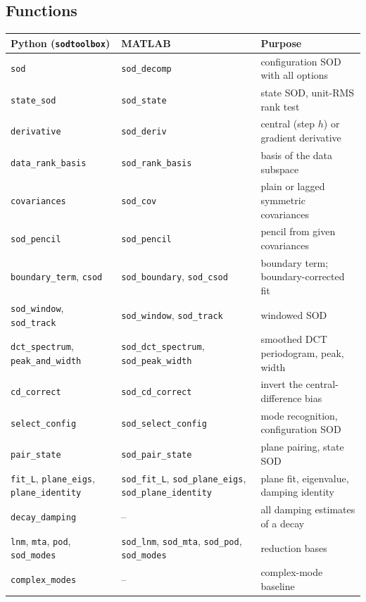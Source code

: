 \documentclass[report]{nld}
\newcommand{\code}[1]{\texttt{#1}}
\begin{document}
\subsection{Functions}
\begin{center}\small
\begin{longtable}{@{}>{\raggedright}p{4.6cm}>{\raggedright}p{4.0cm}p{6.2cm}@{}}
\toprule
Python (\code{sodtoolbox}) & MATLAB & Purpose\\
\midrule\endhead
\code{sod} & \code{sod\_decomp} & configuration SOD with all options\\
\code{state\_sod} & \code{sod\_state} & state SOD, unit-RMS rank test\\
\code{derivative} & \code{sod\_deriv} & central (step $h$) or gradient derivative\\
\code{data\_rank\_basis} & \code{sod\_rank\_basis} & basis of the data subspace\\
\code{covariances} & \code{sod\_cov} & plain or lagged symmetric covariances\\
\code{sod\_pencil} & \code{sod\_pencil} & pencil from given covariances\\
\code{boundary\_term}, \code{csod} & \code{sod\_boundary}, \code{sod\_csod} & boundary term; boundary-corrected fit\\
\code{sod\_window}, \code{sod\_track} & \code{sod\_window}, \code{sod\_track} & windowed SOD\\
\code{dct\_spectrum}, \code{peak\_and\_width} & \code{sod\_dct\_spectrum}, \code{sod\_peak\_width} & smoothed DCT periodogram, peak, width\\
\code{cd\_correct} & \code{sod\_cd\_correct} & invert the central-difference bias\\
\code{select\_config} & \code{sod\_select\_config} & mode recognition, configuration SOD\\
\code{pair\_state} & \code{sod\_pair\_state} & plane pairing, state SOD\\
\code{fit\_L}, \code{plane\_eigs}, \code{plane\_identity} & \code{sod\_fit\_L}, \code{sod\_plane\_eigs}, \code{sod\_plane\_identity} & plane fit, eigenvalue, damping identity\\
\code{decay\_damping} & -- & all damping estimates of a decay\\
\code{lnm}, \code{mta}, \code{pod}, \code{sod\_modes} & \code{sod\_lnm}, \code{sod\_mta}, \code{sod\_pod}, \code{sod\_modes} & reduction bases\\
\code{complex\_modes} & -- & complex-mode baseline\\

\end{longtable}
\end{center}
\end{document}
